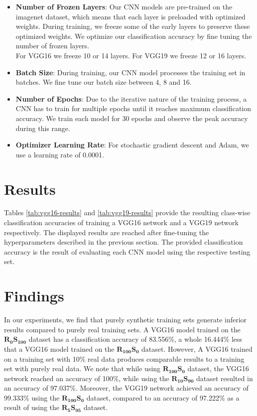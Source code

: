 \begin{itemize}
  \item \textbf{Number of Frozen Layers}: Our CNN models are pre-trained on the imagenet dataset, which means that each layer is preloaded with optimized weights. During training, we freeze some of the early layers to preserve these optimized weights. We optimize our classification accuracy by fine tuning the number of frozen layers.
  \\For VGG16 we freeze 10 or 14 layers. For VGG19 we freeze 12 or 16 layers.
  \item \textbf{Batch Size}: During training, our CNN model processes the training set in batches. We fine tune our batch size between 4, 8 and 16.
  \item \textbf{Number of Epochs}: Due to the iterative nature of the training process, a CNN has to train for multiple epochs until it reaches maximum classification accuracy. We train each model for 30 epochs and observe the peak accuracy during this range.
  \item \textbf{Optimizer Learning Rate}: For stochastic gradient descent and Adam, we use a learning rate of 0.0001.
\end{itemize}


\section{Results}\label{sec:results}

Tables \ref{tab:vgg16-results} and \ref{tab:vgg19-results} provide the resulting class-wise classification accuracies of training a VGG16 network and a VGG19 network respectively. The displayed results are reached after fine-tuning the hyperparameters described in the previous section. The provided classification accuracy is the result of evaluating each CNN model using the respective testing set.


\section{Findings}\label{sec:findings}

In our experiments, we find that purely synthetic training sets generate inferior results compared to purely real training sets. A VGG16 model trained on the $\boldsymbol{R_{0}S_{100}}$ dataset has a classification accuracy of 83.556\%, a whole 16.444\% less that a VGG16 model trained on the $\boldsymbol{R_{100}S_{0}}$ dataset. However, A VGG16 trained on a training set with 10\% real data produces comparable results to a training set with purely real data. We note that while using $\boldsymbol{R_{100}S_{0}}$ dataset, the VGG16 network reached an accuracy of 100\%, while using the $\boldsymbol{R_{10}S_{90}}$ dataset resulted in an accuracy of 97.037\%. Moreover, the VGG19 network achieved an accuracy of 99.333\% using the $\boldsymbol{R_{100}S_{0}}$ dataset, compared to an accuracy of 97.222\% as a result of using the $\boldsymbol{R_{5}S_{95}}$ dataset.

